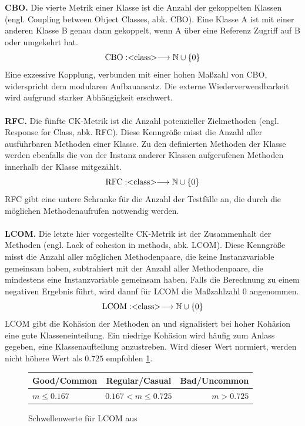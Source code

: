 \documentclass[12pt]{article}
\newcommand{\type}[1]{<\negthickspace\text{#1}\negthickspace> }
\begin{document}
~\\
\\
\textbf{CBO.} Die vierte Metrik einer Klasse ist die Anzahl der
gekoppelten Klassen (engl. Coupling between Object Classes, abk. CBO).
Eine Klasse A ist mit einer anderen Klasse B genau dann
gekoppelt, wenn A über eine Referenz Zugriff auf B oder umgekehrt
hat.
\[
        \text{CBO}: \type{class}
        \longrightarrow \mathbb{N} \cup \left\{ 0 \right\} 
\]
Eine exzessive Kopplung, verbunden mit einer hohen Maßzahl von
CBO, widerspricht dem modularen Aufbauansatz.  Die externe
Wiederverwendbarkeit wird aufgrund starker Abhängigkeit
erschwert.
\\
\\
\textbf{RFC.} Die fünfte CK-Metrik ist die Anzahl potenzieller
Zielmethoden (engl. Response for Class, abk. RFC). Diese
Kenngröße misst die Anzahl aller ausführbaren Methoden einer
Klasse. Zu den definierten Methoden der Klasse werden ebenfalls
die von der Instanz anderer Klassen aufgerufenen Methoden
innerhalb der Klasse mitgezählt.
\[
        \text{RFC}: \type{class}
        \longrightarrow \mathbb{N} \cup \left\{ 0 \right\} 
\]
RFC gibt eine untere Schranke für die Anzahl der Testfälle an, die
durch die möglichen Methodenaufrufen notwendig werden.
\\
\\
\textbf{LCOM.} Die letzte hier vorgestellte CK-Metrik ist der
Zusammenhalt der Methoden (engl. Lack of cohesion in methods,
abk. LCOM).  Diese Kenngröße misst die Anzahl aller möglichen
Methodenpaare, die keine Instanzvariable gemeinsam haben,
subtrahiert mit der Anzahl aller Methodenpaare, die mindestens
eine Instanzvariable gemeinsam haben. Falls die Berechnung 
zu einem negativen Ergebnis führt, wird dannf für LCOM die
Maßzahlzahl 0 angenommen. 
\[
        \text{LCOM}: \type{class}
        \longrightarrow \mathbb{N} \cup \left\{ 0 \right\} 
\]
LCOM gibt die Kohäsion der Methoden an und signalisiert bei hoher
Kohäsion eine gute Klasseneinteilung. Ein niedrige Kohäsion wird
häufig zum Anlass gegeben, eine Klassenaufteilung anzustreben.
Wird dieser Wert normiert, werden nicht höhere Wert als $0.725$
empfohlen \ref{tab:lcomthreshold}.

\begin{figure}[H]
\centering
 \begin{tabular}{lcr}
    \toprule
    Good/Common & Regular/Casual & Bad/Uncommon \\
    \midrule
    $m \leq 0.167$ & $0.167 < m \leq 0.725$ & $m > 0.725$ \\
    \bottomrule
  \end{tabular}
  \caption{Schwellenwerte für LCOM aus \cite{Fil15}}
  \label{tab:lcomthreshold}
\end{figure}
%
\end{document}

